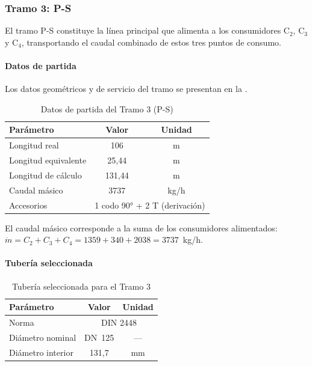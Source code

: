 \subsubsection{Tramo 3: P-S}
\label{subsubsec:tramo3-p-s}

El tramo P-S constituye la línea principal que alimenta a los consumidores C$_2$, C$_3$ y C$_4$, transportando el caudal combinado de estos tres puntos de consumo.

\paragraph{Datos de partida}

Los datos geométricos y de servicio del tramo se presentan en la .

\begin{table}[H]
	\centering
	\caption{Datos de partida del Tramo 3 (P-S)}
	\label{tab:datos-tramo3}
	\begin{tabular}{lcc}
		\toprule
		\textbf{Parámetro}   & \textbf{Valor}                                    & \textbf{Unidad} \\
		\midrule
		Longitud real        & 106                                               & m               \\
		Longitud equivalente & 25{,}44                                           & m               \\
		Longitud de cálculo  & 131{,}44                                          & m               \\
		Caudal másico        & 3737                                              & kg/h            \\
		Accesorios           & \multicolumn{2}{c}{1 codo 90° + 2 T (derivación)}                   \\
		\bottomrule
	\end{tabular}
\end{table}

El caudal másico corresponde a la suma de los consumidores alimentados: $\dot{m} = C_2 + C_3 + C_4 = 1359 + 340 + 2038 = 3737$~kg/h.

\paragraph{Tubería seleccionada}

\begin{table}[H]
	\centering
	\caption{Tubería seleccionada para el Tramo 3}
	\label{tab:tuberia-tramo3}
	\begin{tabular}{lcc}
		\toprule
		\textbf{Parámetro} & \textbf{Valor}               & \textbf{Unidad} \\
		\midrule
		Norma              & \multicolumn{2}{c}{DIN 2448}                   \\
		Diámetro nominal   & DN~125                       & ---             \\
		Diámetro interior  & 131{,}7                      & mm              \\
		\bottomrule
	\end{tabular}
\end{table}

